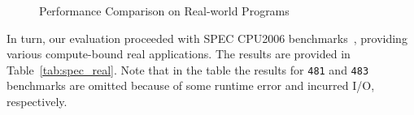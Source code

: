 \documentclass[letter]{ieice}
\begin{document}
\vspace{-.2in}
\begin{figure}[h]
	\centering
	\vspace{-.1in}
	\caption{Performance Comparison on Real-world Programs~\label{fig:synprog_test}}
\vspace{-.25in}
\end{figure}

In turn, our evaluation proceeded with SPEC CPU2006 
benchmarks~\cite{specCpu2006}, providing various \linebreak 
\hbox{compute-bound} real applications. The results are \hbox{provided} in Table~\ref{tab:spec_real}. 
Note that in the table the results for {\tt 481} and {\tt 483} \hbox{benchmarks} 
are omitted because of some runtime error and incurred I/O, respectively.
\end{document}
